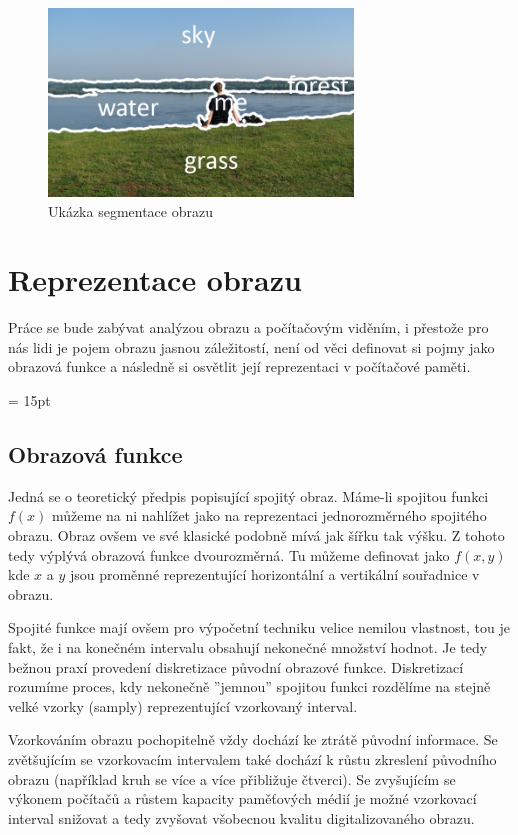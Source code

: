 \documentclass[czech, master, public, dept460, male, cpdeclaration, oneside]{diploma}
\begin{document}
\begin{figure}[H]
	\vspace*{+3.0mm}
	\centering
	\includegraphics[height=5cm]{Figures/explanatory/1-segmentation.jpg}
	\caption{Ukázka segmentace obrazu}
\end{figure}

\section{Reprezentace obrazu}
Práce se bude zabývat analýzou obrazu a počítačovým viděním, i přestože pro nás lidi je pojem obrazu jasnou záležitostí, není od věci definovat si pojmy jako obrazová funkce a následně si osvětlit její reprezentaci v počítačové paměti.

\pagestyle{fancy}
\fancyhf{}
\headsep = 15pt
\renewcommand{\sectionmark}[1]{\markright{\arabic{section}.\ #1}}
\fancyhead[R]{\rightmark}
\renewcommand{\headrulewidth}{1pt}
\fancyfoot[C]{\thepage}

\subsection{Obrazová funkce}
Jedná se o teoretický předpis popisující spojitý obraz. Máme-li spojitou funkci $f(x)$ můžeme na ni nahlížet jako na reprezentaci jednorozměrného spojitého obrazu. Obraz ovšem ve své klasické podobně mívá jak šířku tak výšku. Z tohoto tedy výplývá obrazová funkce dvourozměrná. Tu můžeme definovat jako $f(x,y)$ kde $x$ a $y$ jsou proměnné reprezentující horizontální a vertikální souřadnice v obrazu. \cite{Sojka} \par
Spojité funkce mají ovšem pro výpočetní techniku velice nemilou vlastnost, tou je fakt, že i na konečném intervalu obsahují nekonečné množství hodnot. Je tedy bežnou praxí provedení diskretizace původní obrazové funkce. Diskretizací rozumíme proces, kdy nekonečně ''jemnou'' spojitou funkci rozdělíme na stejně velké vzorky (samply) reprezentující vzorkovaný interval.\par
Vzorkováním obrazu pochopitelně vždy dochází ke ztrátě původní informace. Se zvětšujícím se vzorkovacím intervalem také dochází k růstu zkreslení původního obrazu (například kruh se více a více přibližuje čtverci). Se zvyšujícím se výkonem počítačů a růstem kapacity paměťových médií je možné vzorkovací interval snižovat a tedy zvyšovat všobecnou kvalitu digitalizovaného obrazu. 
\end{document}
